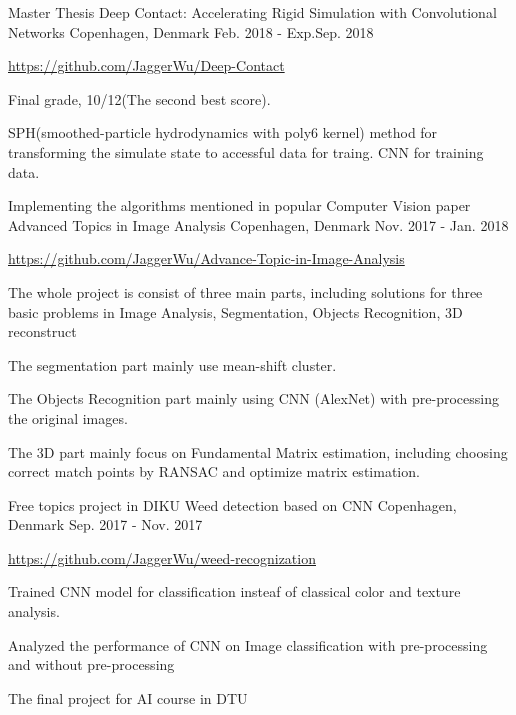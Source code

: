 \begin{cventries}
  \cventry
    {Master Thesis}
    {Deep Contact: Accelerating Rigid Simulation with Convolutional Networks}
    {Copenhagen, Denmark}
    {Feb. 2018 - Exp.Sep. 2018}
    {
      \begin{cvitems}
        \item {\url{https://github.com/JaggerWu/Deep-Contact}}
	\item Final grade, 10/12(The second best score). 
	\item SPH(smoothed-particle hydrodynamics with poly6 kernel) method for transforming the simulate state to accessful data for traing. CNN for training data.
      \end{cvitems}
    }
 \cventry
    {Implementing the algorithms mentioned in popular Computer Vision paper}
    {Advanced Topics in Image Analysis}
    {Copenhagen, Denmark}
    {Nov. 2017 - Jan. 2018}
    {
      \begin{cvitems}
        \item {\url{https://github.com/JaggerWu/Advance-Topic-in-Image-Analysis}}
        \item {The whole project is consist of three main parts, including solutions for three basic problems in Image Analysis, Segmentation, Objects Recognition, 3D reconstruct}
        \item {The segmentation part mainly use mean-shift cluster.}
        \item {The Objects Recognition part mainly using CNN (AlexNet) with pre-processing the original images.}
        \item {The 3D part mainly focus on Fundamental Matrix estimation, including choosing correct match points by RANSAC and optimize matrix estimation.}
      \end{cvitems}
    }
  \cventry
    {Free topics project in DIKU}
    {Weed detection based on CNN}
    {Copenhagen, Denmark}
    {Sep. 2017 - Nov. 2017}
    {
      \begin{cvitems}
        \item {\url{https://github.com/JaggerWu/weed-recognization}}
        \item {Trained CNN model for classification insteaf of classical color and texture analysis. }
        \item {Analyzed the performance of CNN on Image classification with pre-processing and without pre-processing }
      \end{cvitems}
    }
  \cventry
    {The final project for AI course in DTU}

\end{cventries}
